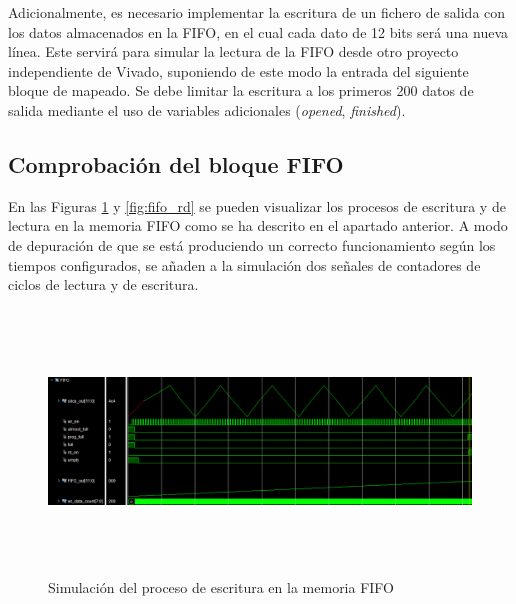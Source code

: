 \vspace{3mm}

Adicionalmente, es necesario implementar la escritura de un fichero de salida con los datos almacenados en la FIFO, en el cual cada dato de 12 bits será una nueva línea. Este servirá para simular la lectura de la FIFO desde otro proyecto independiente de Vivado, suponiendo de este modo la entrada del siguiente bloque de mapeado. Se debe limitar la escritura a los primeros 200 datos de salida mediante el uso de variables adicionales (\textit{opened}, \textit{finished}).

\pagebreak

\subsection{Comprobación del bloque FIFO}

En las Figuras \ref{fig:fifo_wr} y \ref{fig:fifo_rd} se pueden visualizar los procesos de escritura y de lectura en la memoria FIFO como se ha descrito en el apartado anterior. A modo de depuración de que se está produciendo un correcto funcionamiento según los tiempos configurados, se añaden a la simulación dos señales de contadores de ciclos de lectura y de escritura.

\vspace{3mm}

\begin{figure}[h]
    \centering
    \includegraphics[width=1\textwidth,height=7cm]{img/simu/fifo_wr.PNG}
    \caption{Simulación del proceso de escritura en la memoria FIFO}
    \label{fig:fifo_wr}
\end{figure}
    
\vspace{3mm}

